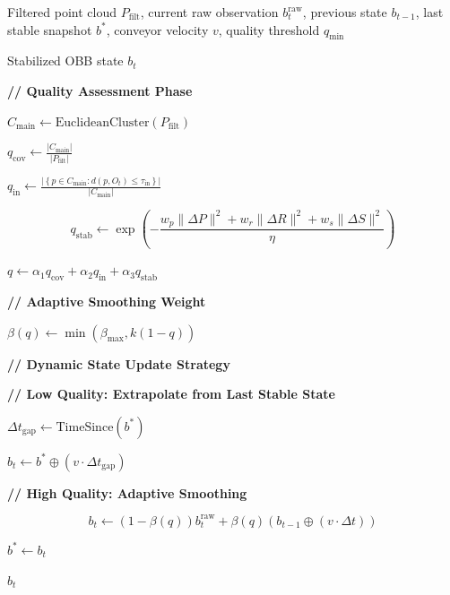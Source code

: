 \begin{algorithm}[t]
\caption{Consistency-Aware OBB Stabilization (CAOS)}
\label{alg:caos}
\begin{algorithmic}[1]

\Require Filtered point cloud $P_{\text{filt}}$,
current raw observation $b_t^{\text{raw}}$,
previous state $b_{t-1}$,
last stable snapshot $b^{*}$,
conveyor velocity $v$,
quality threshold $q_{\text{min}}$

\Ensure Stabilized OBB state $b_t$

\State \textbf{// Quality Assessment Phase}

\State
$C_{\text{main}}
\gets
\mathrm{EuclideanCluster}(P_{\text{filt}})$

\State
$q_{\text{cov}}
\gets
\frac{|C_{\text{main}}|}{|P_{\text{filt}}|}$

\State
$q_{\text{in}}
\gets
\frac{
\left|
\left\{
p\in C_{\text{main}} :
d(p,O_t)\le \tau_{\text{in}}
\right\}
\right|
}
{|C_{\text{main}}|}
$

\State
\[
q_{\text{stab}}
\gets
\exp\!\left(
-\frac{
w_p\|\Delta P\|^2
+
w_r\|\Delta R\|^2
+
w_s\|\Delta S\|^2
}
{\eta}
\right)
\]

\State
$q
\gets
\alpha_1 q_{\text{cov}}
+
\alpha_2 q_{\text{in}}
+
\alpha_3 q_{\text{stab}}$

\State \textbf{// Adaptive Smoothing Weight}

\State
$\beta(q)
\gets
\min\!\left(
\beta_{\text{max}},
k(1-q)
\right)$

\State \textbf{// Dynamic State Update Strategy}


    \State \textbf{// Low Quality: Extrapolate from Last Stable State}

    \State
    $\Delta t_{\text{gap}}
    \gets
    \mathrm{TimeSince}(b^{*})$

    \State
    $b_t
    \gets
    b^{*}
    \oplus
    \left(v\cdot\Delta t_{\text{gap}}\right)$

\Else

    \State \textbf{// High Quality: Adaptive Smoothing}

    \State
    \[
    b_t
    \gets
    \left(1-\beta(q)\right)b_t^{\text{raw}}
    +
    \beta(q)
    \left(
    b_{t-1}
    \oplus
    (v\cdot\Delta t)
    \right)
    \]

    \State
    $b^{*} \gets b_t$

\EndIf

\State \Return $b_t$

\end{algorithmic}
\end{algorithm}

